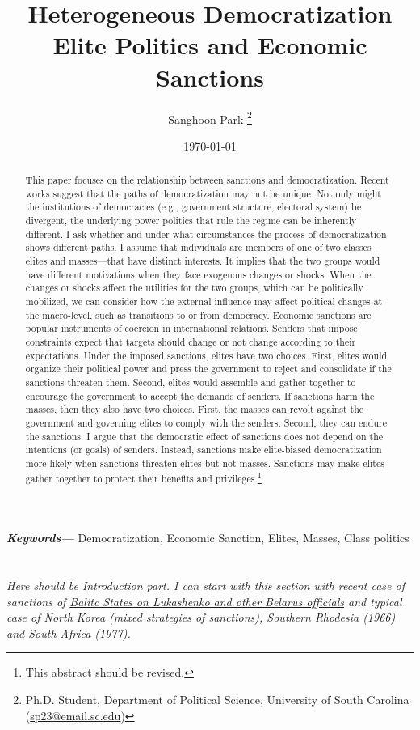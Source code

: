 \documentclass[11pt, letterpage]{article}
\title{\bf Heterogeneous Democratization\\
\Large Elite Politics and Economic Sanctions}
\author{Sanghoon Park
	\thanks{\small Ph.D. Student, Department of Political Science, University of South Carolina\\
		\hspace*{1.8em}(\href{sp23@email.sc.edu}{sp23@email.sc.edu})}}
\date{\today}
\providecommand{\keywords}[1]
{
	\small	
	\hspace*{10mm}\textbf{\textit{Keywords---}} #1
}
\begin{document}
	\maketitle

\begin{abstract}
	\onehalfspacing
	\noindent This paper focuses on the relationship between sanctions and democratization. Recent works suggest that the paths of democratization may not be unique. Not only might the institutions of democracies (e.g., government structure, electoral system) be divergent, the underlying power politics that rule the regime can be inherently different. I ask whether and under what circumstances the process of democratization shows different paths. I assume that individuals are members of one of two classes---elites and masses---that have distinct interests. It implies that the two groups would have different motivations when they face exogenous changes or shocks. When the changes or shocks affect the utilities for the two groups, which can be politically mobilized, we can consider how the external influence may affect political changes at the macro-level, such as transitions to or from democracy. Economic sanctions are popular instruments of coercion in international relations. Senders that impose constraints expect that targets should change or not change according to their expectations. Under the imposed sanctions, elites have two choices. First, elites would organize their political power and press the government to reject and consolidate if the sanctions threaten them. Second, elites would assemble and gather together to encourage the government to accept the demands of senders. If sanctions harm the masses, then they also have two choices. First, the masses can revolt against the government and governing elites to comply with the senders. Second, they can endure the sanctions. I argue that the democratic effect of sanctions does not depend on the intentions (or goals) of senders. Instead, sanctions make elite-biased democratization more likely when sanctions threaten elites but not masses. Sanctions may make elites gather together to protect their benefits and privileges.\footnote{This abstract should be revised.}
\end{abstract}
\keywords{Democratization, Economic Sanction, Elites, Masses, Class politics}
\newpage
\section*{}
\textit{Here should be Introduction part. I can start with this section with recent case of sanctions of \href{https://www.reuters.com/article/us-belarus-election-sanctions/baltic-states-to-hit-lukashenko-other-belarus-officials-with-sanctions-idUSKBN25R0Z7}{Balitc States on Lukashenko and other Belarus officials} and typical case of North Korea (mixed strategies of sanctions), Southern Rhodesia (1966) and South Africa (1977).} 
\end{document}

